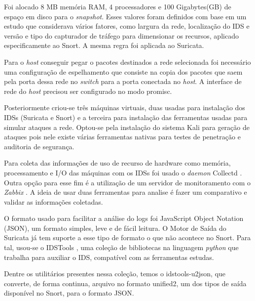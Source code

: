 \documentclass[
	12pt,				
	openright,		
	twoside,	
	a4paper,
	english,	
	brazil	
	]{abntex2}
\begin{document}
Foi alocado 8 MB memória RAM, 4 processadores e 100 Gigabytes(GB) de espaço em disco para o \textit{snapshot}. Esses valores foram definidos com base em um estudo \cite{mikelococo} que considerava vários fatores, como largura da rede, localização do IDS e versão e tipo do capturador de tráfego para dimensionar os recursos, aplicado especificamente ao Snort. A mesma regra foi aplicada ao Suricata.

Para o \textit{host} conseguir pegar o pacotes destinados a rede selecionada foi necessário uma configuração de espelhamento que consiste na copia dos pacotes que saem pela porta dessa rede no \textit{switch} para a porta conectada no \textit{host}. A interface de rede do \textit{host} precisou ser configurado no modo promisc.

Posteriormente criou-se três máquinas virtuais, duas usadas para instalação dos IDSs (Suricata e Snort) e a terceira para instalação das ferramentas usadas para simular ataques a rede. Optou-se pela instalação do sistema Kali \cite{kalilinux} para geração de ataques pois nele existe várias ferramentas nativas para testes de penetração e auditoria de segurança.

Para coleta das informações de uso de recurso de hardware como memória, processamento e I/O das máquinas com os IDSs foi usado o \textit{daemon} Collectd \cite{collectd}. Outra opção para esse fim é a utilização de um servidor de monitoramento com o \textit{Zabbix} \cite{zabbix}. A ideia de usar duas ferramentas para analise é fazer um comparativo e validar as informações coletadas.

O formato usado para facilitar a análise do logs foi JavaScript Object Notation (JSON), um formato simples, leve e de fácil leitura. O Motor de Saída do Suricata já tem suporte a esse tipo de formato o que não acontece no Snort. Para tal, usou-se o IDSTools \cite{py-idstools}, uma coleção de bibliotecas na linguagem \textit{python} que trabalha para auxiliar o IDS, compatível com as ferramentas estudas.

Dentre os utilitários presentes nessa coleção, temos o idstools-u2json, que converte, de forma continua, arquivo no formato unified2, um dos tipos de saída disponível no Snort, para o formato JSON.
\end{document}
